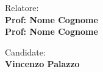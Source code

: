 \begin{titlepage}
\begin{minipage}[t]{0.47\textwidth}
	{\large{Relatore:}{\normalsize\vspace{3mm}
	\bf\\ \large{Prof: Nome Cognome} \normalsize\vspace{3mm}\bf \\ \large{Prof: Nome Cognome}}}
\end{minipage}
\hfill
\begin{minipage}[t]{0.47\textwidth}\raggedleft
	{\large{Candidate:}{\normalsize\vspace{3mm} \bf\\ \large{Vincenzo Palazzo}}}
\end{minipage}

\vspace{30mm}

\end{titlepage}